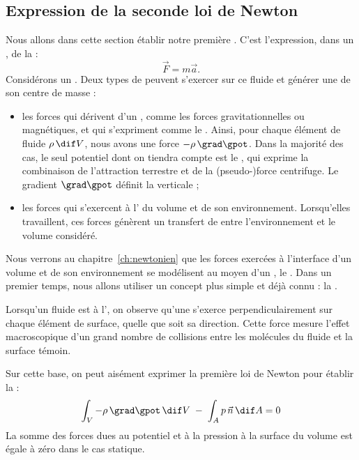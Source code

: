 \subsection{Expression de la seconde loi de Newton}
Nous allons dans cette section établir notre première . C’est l’expression, dans un , de la  :
\[
\vec{F} = m \vec{a}.
\]
Considérons un . Deux types de  peuvent s’exercer sur ce fluide et générer une  de son centre de masse :
\begin{itemize}
  \item les forces qui dérivent d’un , comme les forces gravitationnelles ou magnétiques, et qui s’expriment comme le . Ainsi, pour chaque élément de fluide $\rho \, \dif V$, nous avons une force $-\rho \, \grad \gpot$. Dans la majorité des cas, le seul potentiel dont on tiendra compte est le , qui exprime la combinaison de l’attraction terrestre et de la (pseudo-)force centrifuge. Le gradient $\grad \gpot$ définit la verticale ;
  \item les forces qui s’exercent à l’ du volume et de son environnement. Lorsqu’elles travaillent, ces forces génèrent un transfert de  entre l’environnement et le volume considéré.
\end{itemize}
Nous verrons au chapitre~\ref{ch:newtonien} que les forces exercées à l’interface d’un volume et de son environnement se modélisent au moyen d’un , le . Dans un premier temps, nous allons utiliser un concept plus simple et déjà connu : la .

Lorsqu’un fluide est à l’, on observe qu’une  s’exerce perpendiculairement sur chaque élément de surface, quelle que soit sa direction. Cette force mesure l’effet macroscopique d’un grand nombre de collisions entre les molécules du fluide et la surface témoin.

Sur cette base, on peut aisément exprimer la première loi de Newton pour établir la  :
\begin{equation}
  \int_V - \rho \, \grad \gpot \, \dif V \; - \; \int_A p \, \vec{n} \, \dif A = 0
  \label{eq:hydrostat_int}
\end{equation}
La somme des forces dues au potentiel et à la pression à la surface du volume est égale à zéro dans le cas statique.

